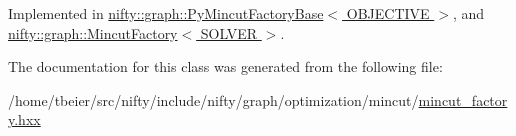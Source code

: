 Implemented in \hyperlink{classnifty_1_1graph_1_1PyMincutFactoryBase_a31454e9a663456f9b39363eb8f6aea71}{nifty\+::graph\+::\+Py\+Mincut\+Factory\+Base$<$ O\+B\+J\+E\+C\+T\+I\+V\+E $>$}, and \hyperlink{classnifty_1_1graph_1_1MincutFactory_a868a6628c4f9421ee14b75e867cdf06d}{nifty\+::graph\+::\+Mincut\+Factory$<$ S\+O\+L\+V\+E\+R $>$}.



The documentation for this class was generated from the following file\+:\begin{DoxyCompactItemize}
\item 
/home/tbeier/src/nifty/include/nifty/graph/optimization/mincut/\hyperlink{mincut__factory_8hxx}{mincut\+\_\+factory.\+hxx}\end{DoxyCompactItemize}
